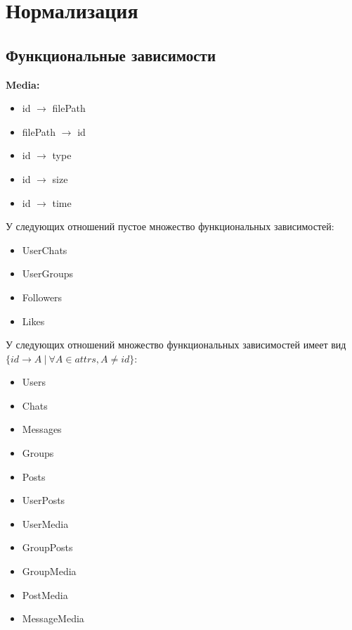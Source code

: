 \documentclass[12pt, a4paper] {ncc}
\begin{document}
\section{Нормализация}
\subsection{Функциональные зависимости}
\textbf{Media:}
\begin{itemize}
\item id $\rightarrow$ filePath
\item filePath $\rightarrow$ id
\item id $\rightarrow$ type
\item id $\rightarrow$ size
\item id $\rightarrow$ time
\end{itemize}
У следующих отношений пустое множество функциональных зависимостей:
\begin{itemize}
\item UserChats
\item UserGroups
\item Followers
\item Likes
\end{itemize}
У следующих отношений множество функциональных зависимостей имеет вид \\
$\{id \rightarrow A ~ | ~ \forall A \in \textit{attrs}, A \ne id\}$:
\begin{itemize}
\item Users
\item Chats
\item Messages
\item Groups
\item Posts
\item UserPosts
\item UserMedia
\item GroupPosts
\item GroupMedia
\item PostMedia
\item MessageMedia
\end{itemize}
\end{document}
